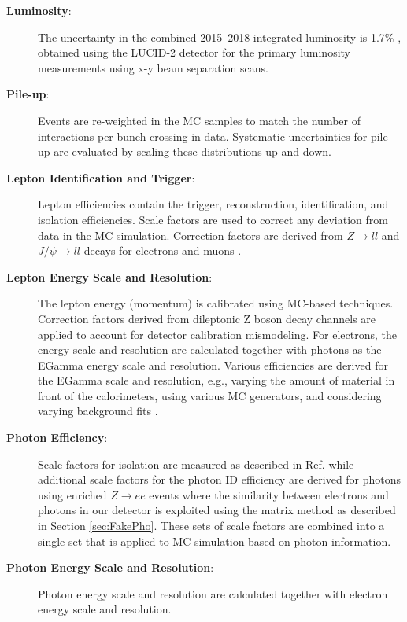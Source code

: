 \begin{description}
\item[\textbf{Luminosity}:] The uncertainty in the combined 2015--2018 integrated luminosity is 1.7\%  \cite{ATLAS-CONF-2019-021}, obtained using the LUCID-2 detector \cite{LUCID2} for the primary luminosity measurements using x-y beam separation scans.

\item[\textbf{Pile-up}:]  Events are re-weighted in the MC samples to match the number of interactions per bunch crossing in data.  Systematic uncertainties for pile-up are evaluated by scaling these distributions up and down.

\item[\textbf{Lepton Identification and Trigger}:]   Lepton efficiencies contain the trigger, reconstruction, identification, and isolation efficiencies.  Scale factors are used to correct any deviation from data in the MC simulation.  Correction factors are derived from $Z\rightarrow ll$ and $J/ \psi \rightarrow ll$ decays for electrons \cite{ElectronID} and muons \cite{MuonID}.

\item[\textbf{Lepton Energy Scale and Resolution}:]  The lepton energy (momentum) is calibrated using MC-based techniques.  Correction factors derived from dileptonic Z boson decay channels are applied to account for detector calibration mismodeling.  For electrons, the energy scale and resolution are calculated together with photons as the EGamma energy scale and resolution.  Various efficiencies are derived for the EGamma scale and resolution, e.g., varying the amount of material in front of the calorimeters, using various MC generators, and considering varying background fits \cite{ElectronID, PhotonID}.
\item[\textbf{Photon Efficiency}:]  Scale factors for isolation are measured as described in Ref. \cite{Lesage:2017uzg} while additional scale factors for the photon ID efficiency are derived for photons using enriched $Z\rightarrow ee$ events where the similarity between electrons and photons in our detector is exploited using the matrix method as described in Section \ref{sec:FakePho}. These sets of scale factors are combined into a single set that is applied to MC simulation based on photon information.

\item[\textbf{Photon Energy Scale and Resolution}:]  Photon energy scale and resolution are calculated together with electron energy scale and resolution.


\end{description}
